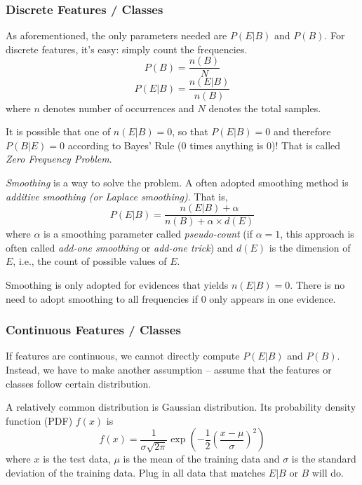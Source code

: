 \documentclass{note}
\begin{document}
\subsubsection{Discrete Features / Classes}

As aforementioned, the only parameters needed are $P(E|B)$ and $P(B)$. For discrete features, it's easy: simply count the frequencies. 
$$
P(B) = \frac{n(B)}{N}
$$
$$
P(E|B) = \frac{n(E|B)}{n(B)}
$$
where $n$ denotes number of occurrences and $N$ denotes the total samples.

\begin{important}
    It is possible that one of $n(E|B) = 0$, so that $P(E|B) = 0$ and therefore $P(B|E) = 0$ according to Bayes' Rule ($0$ times anything is $0$)! That is called \textit{Zero Frequency Problem}. 

    \textit{Smoothing} is a way to solve the problem. A often adopted smoothing method is \textit{additive smoothing (or Laplace smoothing)}. That is, 
    \begin{equation*}
        P(E|B) = \frac{n(E|B) + \alpha}{n(B) + \alpha \times d(E)}
    \end{equation*}
    where $\alpha$ is a smoothing parameter called \textit{pseudo-count} (if $\alpha = 1$, this approach is often called \textit{add-one smoothing} or \textit{add-one trick}) and $d(E)$ is the dimension of $E$, i.e., the count of possible values of $E$.

    Smoothing is only adopted for evidences that yields $n(E|B) = 0$. There is no need to adopt smoothing to all frequencies if $0$ only appears in one evidence. 
\end{important}

\subsubsection{Continuous Features / Classes}

If features are continuous, we cannot directly compute $P(E|B)$ and $P(B)$. Instead, we have to make another assumption -- assume that the features or classes follow certain distribution.

A relatively common distribution is Gaussian distribution. Its probability density function (PDF) $f(x)$ is 
$$
f(x) = \frac {1}{\sigma {\sqrt {2\pi }}} \exp(-{\frac {1}{2}}(\frac {x-\mu }{\sigma })^{2})
$$
where $x$ is the test data, $\mu$ is the mean of the training data and $\sigma$ is the standard deviation of the training data. Plug in all data that matches $E|B$ or $B$ will do.
\end{document}
